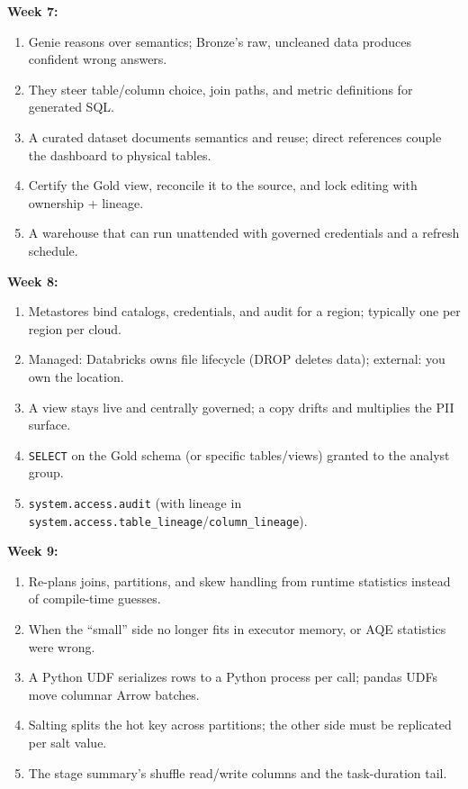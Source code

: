 \documentclass[11pt, a4paper]{article}
\begin{document}
\noindent\textbf{Week 7:}
\begin{enumerate}[itemsep=0pt, leftmargin=2em]
    \item Genie reasons over semantics; Bronze's raw, uncleaned data produces confident wrong answers.
    \item They steer table/column choice, join paths, and metric definitions for generated SQL.
    \item A curated dataset documents semantics and reuse; direct references couple the dashboard to physical tables.
    \item Certify the Gold view, reconcile it to the source, and lock editing with ownership + lineage.
    \item A warehouse that can run unattended with governed credentials and a refresh schedule.
\end{enumerate}
\noindent\textbf{Week 8:}
\begin{enumerate}[itemsep=0pt, leftmargin=2em]
    \item Metastores bind catalogs, credentials, and audit for a region; typically one per region per cloud.
    \item Managed: Databricks owns file lifecycle (DROP deletes data); external: you own the location.
    \item A view stays live and centrally governed; a copy drifts and multiplies the PII surface.
    \item \texttt{SELECT} on the Gold schema (or specific tables/views) granted to the analyst group.
    \item \texttt{system.access.audit} (with lineage in \texttt{system.access.table\_lineage}/\texttt{column\_lineage}).
\end{enumerate}
\noindent\textbf{Week 9:}
\begin{enumerate}[itemsep=0pt, leftmargin=2em]
    \item Re-plans joins, partitions, and skew handling from runtime statistics instead of compile-time guesses.
    \item When the ``small'' side no longer fits in executor memory, or AQE statistics were wrong.
    \item A Python UDF serializes rows to a Python process per call; pandas UDFs move columnar Arrow batches.
    \item Salting splits the hot key across partitions; the other side must be replicated per salt value.
    \item The stage summary's shuffle read/write columns and the task-duration tail.
\end{enumerate}
\end{document}
